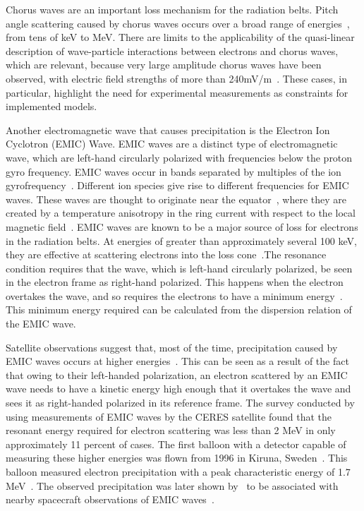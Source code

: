 Chorus waves are an important loss mechanism for the radiation belts. Pitch angle scattering caused by chorus waves occurs over a broad range of energies~\citet{thorne2010}, from tens of keV to MeV. There are limits to the applicability of the quasi-linear description of wave-particle interactions between electrons and chorus waves, which are relevant, because very large amplitude chorus waves have been observed, with electric field strengths of more than 240mV/m~\citep{cattell2008,thorne2010}. These cases, in particular, highlight the need for experimental measurements as constraints for implemented models. 

Another electromagnetic wave that causes precipitation is the Electron Ion Cyclotron (EMIC) Wave. EMIC waves are a distinct type of electromagnetic wave, which are left-hand circularly polarized with frequencies below the proton gyro frequency. EMIC waves occur in bands separated by multiples of the ion gyrofrequency~\citep{thorne2010}. Different ion species give rise to different frequencies for EMIC waves. These waves are thought to originate near the equator~\citep{fraser1996,lotouaniu2005,millan2007}, where they are created by a temperature anisotropy in the ring current with respect to the local magnetic field~\citep{jordanova2001}. EMIC waves are known to be a major source of loss for electrons in the radiation belts. At energies of greater than approximately several 100 keV, they are effective at scattering electrons into the loss cone~\citet{thorne1981,millan2007}.The resonance condition requires that the wave, which is left-hand circularly polarized, be seen in the electron frame as right-hand polarized. This happens when the electron overtakes the wave, and so requires the electrons to have a  minimum energy~\citet{millan2007}. This minimum energy required can be calculated from the dispersion relation of the EMIC wave.

Satellite observations suggest that, most of the time, precipitation caused by EMIC waves occurs at higher energies~\citep{millan2007}. This can be seen as a result of the fact that owing to their left-handed polarization, an electron scattered by an EMIC wave needs to have a kinetic energy high enough that it overtakes the wave and sees it as right-handed polarized in its reference frame. The survey conducted by~\citep{merideth2003} using measurements of EMIC waves by the CERES satellite found that the resonant energy required for electron scattering was less than 2 MeV in only approximately 11 percent of cases. The first balloon with a detector capable of measuring these higher energies was flown from 1996 in Kiruna, Sweden~\citep{millan2007}. This balloon measured electron precipitation with a peak characteristic energy of 1.7 MeV~\citep{foat1998}. The observed precipitation was later shown by~\citep{lorentzen2000} to be associated with nearby spacecraft observations of EMIC waves~\citet{millan2007}.


